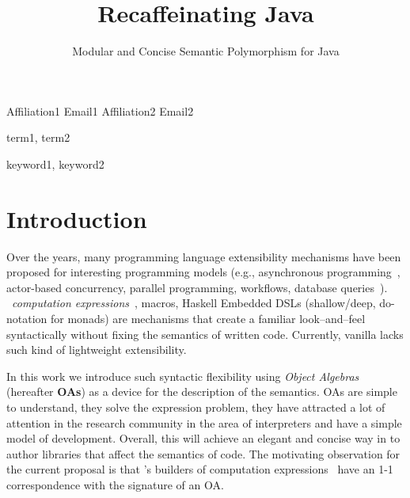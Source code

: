 \documentclass{sigplanconf}
\begin{document}




\title{Recaffeinating Java}
\subtitle{Modular and Concise Semantic Polymorphism for Java}

           {Affiliation1}
           {Email1}
           {Affiliation2}
           {Email2}

\maketitle

\begin{abstract}
\end{abstract}


\terms
term1, term2

\keywords
keyword1, keyword2

\section{Introduction}

Over the years, many programming language extensibility mechanisms have
been proposed for interesting programming models (e.g., asynchronous
programming~\cite{bierman_pause_2012}, actor-based concurrency,
parallel programming, workflows, database queries~\cite{meijer_linq:_2006}). 
\fs{}~\emph{computation expressions}~\cite{petricek_f_2014}, macros,
Haskell Embedded DSLs (shallow/deep, do-notation for monads) are
mechanisms that create a familiar look--and--feel syntactically
without fixing the semantics of written code. Currently, vanilla
\java{} lacks such kind of lightweight extensibility.

In this work we introduce such syntactic flexibility using \emph{Object
  Algebras}~\cite{oliveira_extensibility_2012} (hereafter
\textbf{OAs}) as a device for the description of the semantics. OAs
are simple to understand, they solve the expression problem, they have
attracted a lot of attention in the research community in the area of
interpreters and have a simple model of development. Overall, this
will achieve an elegant and concise way in \java{} to author libraries
that affect the semantics of code. The motivating
observation for the current proposal is that \fs{}'s builders of
computation expressions~\cite[Chapter~6.3.10]{syme_f_2012} have an 1-1
correspondence with the signature of an OA. 
\end{document}
